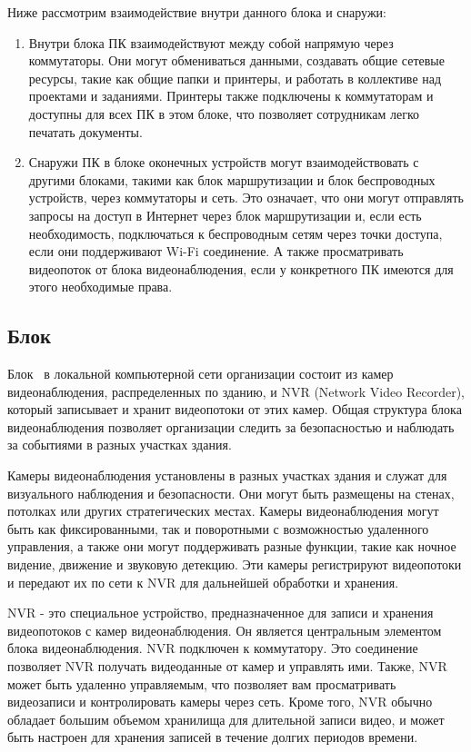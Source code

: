Ниже рассмотрим взаимодействие внутри данного блока и снаружи:
\begin{enumerate}
    \item Внутри блока ПК взаимодействуют между собой напрямую через коммутаторы. 
    Они могут обмениваться данными, создавать общие сетевые ресурсы, такие как общие папки и принтеры, и работать в коллективе над проектами и заданиями.
    Принтеры также подключены к коммутаторам и доступны для всех ПК в этом блоке, что позволяет сотрудникам легко печатать документы.

    \item Снаружи ПК в блоке оконечных устройств могут взаимодействовать с другими блоками, 
    такими как блок маршрутизации и блок беспроводных устройств, через коммутаторы и сеть. 
    Это означает, что они могут отправлять запросы на доступ в Интернет через блок маршрутизации и,
    если есть необходимость, подключаться к беспроводным сетям через точки доступа, если они поддерживают Wi-Fi соединение.
    А также просматривать видеопоток от блока видеонаблюдения, если у конкретного ПК имеются для этого необходимые права. 
\end{enumerate}

\subsection{Блок \blockVideo}

Блок \blockVideo\ в локальной компьютерной сети организации состоит из камер видеонаблюдения, распределенных по зданию, и NVR (Network Video Recorder), 
который записывает и хранит видеопотоки от этих камер. 
Общая структура блока видеонаблюдения позволяет организации следить за безопасностью и наблюдать за событиями в разных участках здания. 

Камеры видеонаблюдения установлены в разных участках здания и служат для визуального наблюдения и безопасности. 
Они могут быть размещены на стенах, потолках или других стратегических местах.
Камеры видеонаблюдения могут быть как фиксированными, так и поворотными с возможностью удаленного управления, 
а также они могут поддерживать разные функции, такие как ночное видение, движение и звуковую детекцию.
Эти камеры регистрируют видеопотоки и передают их по сети к NVR для дальнейшей обработки и хранения.

NVR - это специальное устройство, предназначенное для записи и хранения видеопотоков с камер видеонаблюдения.
Он является центральным элементом блока видеонаблюдения.
NVR подключен к коммутатору. Это соединение позволяет NVR получать видеоданные от камер и управлять ими. 
Также, NVR может быть удаленно управляемым, что позволяет вам просматривать видеозаписи и контролировать камеры через сеть.
Кроме того, NVR обычно обладает большим объемом хранилища для длительной записи видео, 
и может быть настроен для хранения записей в течение долгих периодов времени.

